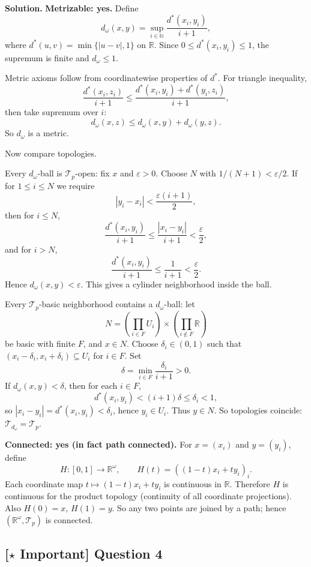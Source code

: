 \documentclass{article}
\newcommand{\R}{\mathbb{R}}
\newcommand{\N}{\mathbb{N}}
\newcommand{\important}{\texorpdfstring{\textbf{[\(\star\) Important]}}{[Important]}}
\newenvironment{solution}{\par\noindent\textbf{Solution.}\quad}{\par}
\begin{document}
\begin{solution}
  \textbf{Metrizable: yes.}
  Define
  \[
    d_\omega(x,y)=\sup_{i\in\N}\frac{d^*(x_i,y_i)}{i+1},
  \]
  where $d^*(u,v)=\min\{|u-v|,1\}$ on $\R$.
  Since $0\le d^*(x_i,y_i)\le 1$, the supremum is finite and $d_\omega\le 1$.

  Metric axioms follow from coordinatewise properties of $d^*$.
  For triangle inequality,
  \[
    \frac{d^*(x_i,z_i)}{i+1}
    \le \frac{d^*(x_i,y_i)+d^*(y_i,z_i)}{i+1},
  \]
  then take supremum over $i$:
  \[
    d_\omega(x,z)\le d_\omega(x,y)+d_\omega(y,z).
  \]
  So $d_\omega$ is a metric.

  Now compare topologies.

  Every $d_\omega$-ball is $\mathcal{T}_p$-open:
  fix $x$ and $\varepsilon>0$. Choose $N$ with $1/(N+1)<\varepsilon/2$.
  If for $1\le i\le N$ we require
  \[
    |y_i-x_i|<\frac{\varepsilon(i+1)}{2},
  \]
  then for $i\le N$,
  \[
    \frac{d^*(x_i,y_i)}{i+1}\le \frac{|x_i-y_i|}{i+1}<\frac\varepsilon2,
  \]
  and for $i>N$,
  \[
    \frac{d^*(x_i,y_i)}{i+1}\le \frac{1}{i+1}<\frac\varepsilon2.
  \]
  Hence $d_\omega(x,y)<\varepsilon$. This gives a cylinder
  neighborhood inside the ball.

  Every $\mathcal{T}_p$-basic neighborhood contains a $d_\omega$-ball:
  let
  \[
    N=\left(\prod_{i\in F}U_i\right)\times\left(\prod_{i\notin F}\R\right)
  \]
  be basic with finite $F$, and $x\in N$.
  Choose $\delta_i\in(0,1)$ such that
  $(x_i-\delta_i,x_i+\delta_i)\subseteq U_i$ for $i\in F$.
  Set
  \[
    \delta=\min_{i\in F}\frac{\delta_i}{i+1}>0.
  \]
  If $d_\omega(x,y)<\delta$, then for each $i\in F$,
  \[
    d^*(x_i,y_i)<(i+1)\delta\le \delta_i<1,
  \]
  so $|x_i-y_i|=d^*(x_i,y_i)<\delta_i$, hence $y_i\in U_i$.
  Thus $y\in N$.
  So topologies coincide: $\mathcal{T}_{d_\omega}=\mathcal{T}_p$.

  \textbf{Connected: yes (in fact path connected).}
  For $x=(x_i)$ and $y=(y_i)$, define
  \[
    H:[0,1]\to\R^\omega,\qquad H(t)=((1-t)x_i+ty_i)_i.
  \]
  Each coordinate map $t\mapsto (1-t)x_i+ty_i$ is continuous in $\R$.
  Therefore $H$ is continuous for the product topology (continuity of
  all coordinate projections).
  Also $H(0)=x$, $H(1)=y$.
  So any two points are joined by a path; hence $(\R^\omega,\mathcal{T}_p)$ is connected.
\end{solution}

\subsection{\important{} Question 4}
\end{document}
